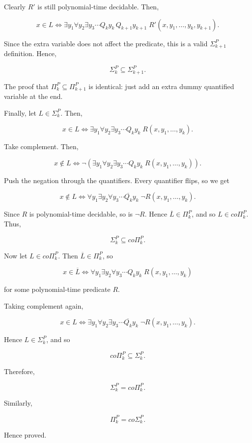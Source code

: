 \documentclass[11pt]{article}
\begin{document}
Clearly $R'$ is still polynomial-time decidable. Then,

\[
x \in L \iff \exists y_1 \forall y_2 \exists y_3 \cdots Q_k y_k \, Q_{k+1} y_{k+1} \; R'(x,y_1,\dots,y_k,y_{k+1}).
\]

Since the extra variable does not affect the predicate, this is a valid $\Sigma_{k+1}^P$ definition. Hence,

\[
\Sigma_k^P \subseteq \Sigma_{k+1}^P.
\]

The proof that $\Pi_k^P \subseteq \Pi_{k+1}^P$ is identical: just add an extra dummy quantified variable at the end.

Finally, let $L \in \Sigma_k^P$. Then,

\[
x \in L \iff \exists y_1 \forall y_2 \exists y_3 \cdots Q_k y_k \; R(x,y_1,\dots,y_k).
\]

Take complement. Then,

\[
x \notin L \iff \neg(\exists y_1 \forall y_2 \exists y_3 \cdots Q_k y_k \; R(x,y_1,\dots,y_k)).
\]

Push the negation through the quantifiers. Every quantifier flips, so we get

\[
x \notin L \iff \forall y_1 \exists y_2 \forall y_3 \cdots \overline{Q_k} y_k \; \neg R(x,y_1,\dots,y_k).
\]

Since $R$ is polynomial-time decidable, so is $\neg R$. Hence $\overline{L} \in \Pi_k^P$, and so $L \in co\Pi_k^P$. Thus,

\[
\Sigma_k^P \subseteq co\Pi_k^P.
\]

Now let $L \in co\Pi_k^P$. Then $\overline{L} \in \Pi_k^P$, so

\[
x \in \overline{L} \iff \forall y_1 \exists y_2 \forall y_3 \cdots Q_k y_k \; R(x,y_1,\dots,y_k)
\]

for some polynomial-time predicate $R$.

Taking complement again,

\[
x \in L \iff \exists y_1 \forall y_2 \exists y_3 \cdots \overline{Q_k} y_k \; \neg R(x,y_1,\dots,y_k).
\]

Hence $L \in \Sigma_k^P$, and so

\[
co\Pi_k^P \subseteq \Sigma_k^P.
\]

Therefore,

\[
\Sigma_k^P = co\Pi_k^P.
\]

Similarly,

\[
\Pi_k^P = co\Sigma_k^P.
\]

Hence proved.
\end{document}
